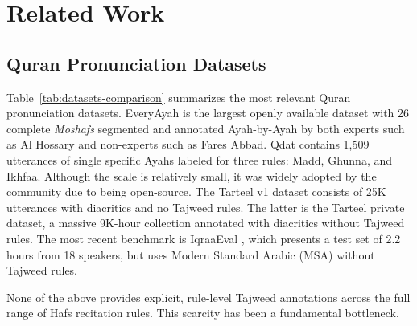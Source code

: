 \section{Related Work}

\subsection{Quran Pronunciation Datasets}
Table~\ref{tab:datasets-comparison} summarizes the most relevant Quran pronunciation datasets. EveryAyah is the largest openly available dataset with 26 complete \emph{Moshafs} segmented and annotated Ayah-by-Ayah by both experts such as Al Hossary and non-experts such as Fares Abbad. Qdat \cite{osman2021qdat} contains 1,509 utterances of single specific Ayahs labeled for three rules: Madd, Ghunna, and Ikhfaa. Although the scale is relatively small, it was widely adopted by the community \cite{10092350,shaiakhmetov2025evaluation} due to being open-source. The Tarteel v1 dataset \cite{khan2021tarteel} consists of 25K utterances with diacritics and no Tajweed rules. The latter is the Tarteel private dataset, a massive 9K-hour collection annotated with diacritics without Tajweed rules. The most recent benchmark is IqraaEval \cite{kheir2025towards}, which presents a test set of 2.2 hours from 18 speakers, but uses Modern Standard Arabic (MSA) without Tajweed rules.

None of the above provides explicit, rule-level Tajweed annotations across the full range of Hafs recitation rules. This scarcity has been a fundamental bottleneck.

